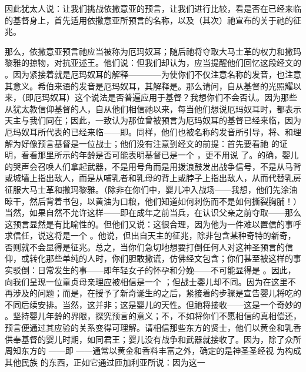 因此犹太人说：让我们挑战依撒意亚的预言，让我们进行比较，看是否在已经来临的基督身上，首先适用依撒意亚所预言的名称，以及（其次）祂宣布的关于祂的征兆。\par

那么，依撒意亚预言祂应当被称为厄玛奴耳；随后祂将夺取大马士革的权力和撒玛黎雅的掠物，对抗亚述王。他们说：但我们却认为，应当提醒他们回忆这段经文的 。因为紧接着就是厄玛奴耳的解释————为使你们不仅注意名称的发音，也注意其意义。希伯来语的发音是厄玛奴耳，其解释是。那么请问，自从基督的光照耀以来，（即厄玛奴耳）这个说法是否普遍应用于基督？我想你们不会否认。因为那些从犹太教信仰基督的人，自从他们相信祂以来，每当他们想说厄玛奴耳时，都表示天主与我们同在；因此，一致认为那位曾被预言为厄玛奴耳的基督已经来临，因为厄玛奴耳所代表的已经来临——即。同样，他们也被名称的发音所引导，将、和理解为好像预言基督是一位战士；他们没有注意到经文的前提：首先要看祂  的证明，看看那里所示的年龄是否可能表明基督已是一个 ，更不用说  了。的确，婴儿的哭声会召唤人们拿起武器，不是用号角而是用拨浪鼓发出战争信号，不是从马背或城墙上指出敌人，而是从哺乳者和乳母的背上或脖子上指出敌人，从而代替乳房征服大马士革和撒玛黎雅。（除非在你们中，婴儿冲入战场——我想，他们先涂油晾干，然后背着书包，以黄油为口粮，他们知道如何刺伤而不是如何撕裂胸脯！）当然，如果自然不允许这样——即在成年之前当兵，在认识父亲之前夺取——那么这预言显然是有比喻性的。但他们又说：这很合理，因为他为一件难以置信的事呼求信任，说这将是一个 。他说，但出自天主的征兆，除非包含某种奇特的新奇，否则就不会显得是征兆。总之，当你们急切地想要打倒任何人对这神圣预言的信仰，或转化那些单纯的人时，你们胆敢撒谎，仿佛经文包含；你们甚至被这样的事实驳倒：日常发生的事——即年轻女子的怀孕和分娩——不可能显得是 。因此，向我们呈现一位童贞母亲理应被相信是一个 ；但战士婴儿却不同。因为在这里不再涉及的问题；而是，在授予了新奇诞生的之后，紧接着的步骤是宣告婴儿将吃的不同后续安排。当然，这并非；这是婴儿的天性。但祂将接收——这是一个奇妙的 。坚持婴儿年龄的界限，探究预言的意义；不，不如将你们不愿相信的真相偿还，预言便通过其应验的关系变得可理解。请相信那些东方的贤士，他们以黄金和乳香供奉基督的婴儿时期，如同君王；婴儿没有战争和武器就接收了。因为，除了众所周知东方的 ——即 ——通常以黄金和香料丰富之外，确定的是神圣圣经视  为构成其他民族  的东西，正如它通过匝加利亚所说：因为这一  